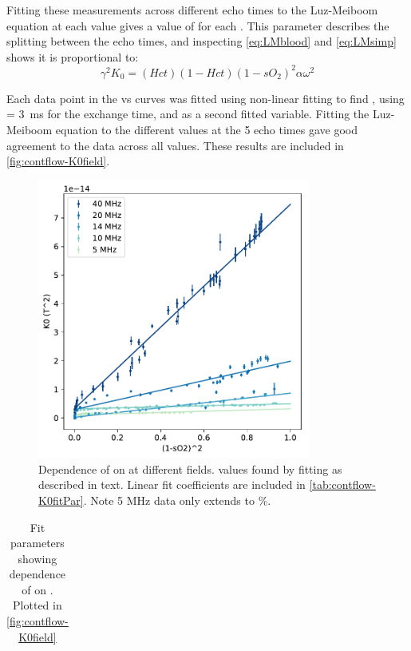 Fitting these \Rtwo measurements across different echo times to the Luz-Meiboom equation at each \SOtwo value gives a value of \Kzero for each \SOtwo.
This parameter describes the splitting between the echo times, and inspecting \autoref{eq:LMblood} and \autoref{eq:LMsimp} shows it is proportional to:
\begin{displaymath}
\gamma^2 K_0 = (Hct)(1-Hct)(1-sO_2)^2 \alpha \omega^2
\end{displaymath}

Each data point in the \Rtwo vs \SOtwo curves was fitted using non-linear fitting to find \Kzero, using  \Texc =  \SI{3}{ms} for the exchange time, and \TtwoO as a second fitted variable.
Fitting the Luz-Meiboom equation to the different \Rtwo values at the 5 echo times gave good agreement to the data across all \SOtwo values.
These results are included in \autoref{fig:contflow-K0field}.
\begin{figure}[t]
\centering
\includegraphics[width=0.8\textwidth]{figures/contflow/K0field.pdf}
\caption[Relationship between \Kzero on \SOtwo at different fields]{Dependence of \Kzero on \SOtwo at different fields. \Kzero values found by fitting as described in text. Linear fit coefficients are included in \autoref{tab:contflow-K0fitPar}. Note 5 MHz data only extends to \%.}
\label{fig:contflow-K0field}
\end{figure}

\begin{table}[b]

\centering
\begin{tabular}{|c|cc|c|}
\hline

\hline
\end{tabular}
\caption[Fit parameters for dependence of \Kzero on \SOtwo]{Fit parameters showing dependence of \Kzero on \SOtwo. Plotted in \autoref{fig:contflow-K0field}}
\label{tab:contflow-K0fitPar}
\end{table}

